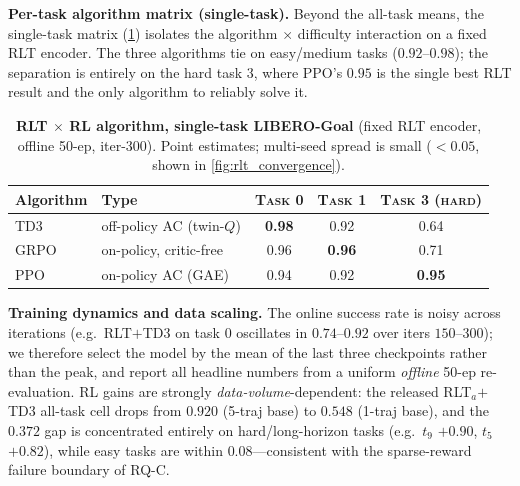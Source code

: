 \textbf{Per-task algorithm matrix (single-task).} Beyond the all-task means, the single-task matrix (\cref{tab:rlt_algo}) isolates the algorithm $\times$ difficulty interaction on a fixed RLT encoder. The three algorithms tie on easy/medium tasks ($0.92$--$0.98$); the separation is entirely on the hard task $3$, where PPO's $0.95$ is the single best RLT result and the only algorithm to reliably solve it.

\begin{table}[t]
    \centering
    \caption{\textbf{RLT $\times$ RL algorithm, single-task LIBERO-Goal} (fixed RLT encoder, offline 50-ep, iter-300). Point estimates; multi-seed spread is small ($<0.05$, shown in \cref{fig:rlt_convergence}).}
    \label{tab:rlt_algo}
    \vspace{0.3em}
    \footnotesize
    \setlength{\tabcolsep}{8pt}
    \renewcommand{\arraystretch}{1.15}
    \begin{tabular}{@{}l l ccc@{}}
        \toprule
        \textbf{Algorithm} & \textbf{Type} & \textsc{Task 0} & \textsc{Task 1} & \textsc{Task 3 (hard)} \\
        \midrule
        TD3  & off-policy AC (twin-$Q$)      & \textbf{0.98} & 0.92 & 0.64 \\
        GRPO & on-policy, critic-free        & 0.96 & \textbf{0.96} & 0.71 \\
        PPO  & on-policy AC (GAE)            & 0.94 & 0.92 & \textbf{0.95} \\
        \bottomrule
    \end{tabular}
\end{table}

\textbf{Training dynamics and data scaling.} The online success rate is noisy across iterations (e.g.\ RLT$+$TD3 on task $0$ oscillates in $0.74$--$0.92$ over iters $150$--$300$); we therefore select the model by the mean of the last three checkpoints rather than the peak, and report all headline numbers from a uniform \emph{offline} 50-ep re-evaluation. RL gains are strongly \emph{data-volume}-dependent: the released RLT$_a$$+$TD3 all-task cell drops from $0.920$ (5-traj base) to $0.548$ (1-traj base), and the $0.372$ gap is concentrated entirely on hard/long-horizon tasks (e.g.\ $t_9$ $+0.90$, $t_5$ $+0.82$), while easy tasks are within $0.08$---consistent with the sparse-reward failure boundary of RQ-C.

